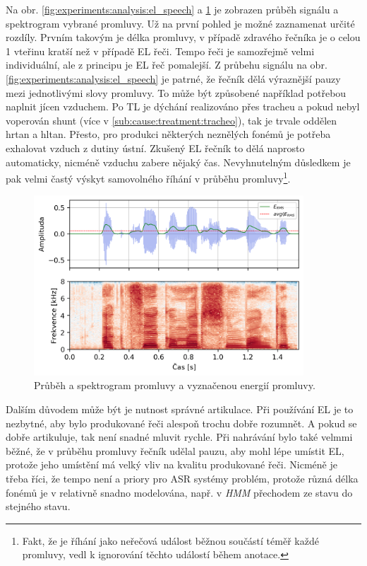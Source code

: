 Na obr. \ref{fig:experiments:analysis:el_speech} a \ref{fig:experiments:analysis:normal_speech} je zobrazen průběh signálu a spektrogram vybrané promluvy. Už na první pohled je možné zaznamenat určité rozdíly. Prvním takovým je délka promluvy, v případě zdravého řečníka je o celou 1 vteřinu kratší než v případě EL řeči. Tempo řeči je samozřejmě velmi individuální, ale z principu je EL řeč pomalejší. Z průbehu signálu na obr. \ref{fig:experiments:analysis:el_speech} je patrné, že řečník dělá výraznější pauzy mezi jednotlivými slovy promluvy. To může být způsobené například potřebou naplnit jícen vzduchem. Po TL je dýchání realizováno přes tracheu a pokud nebyl voperován shunt (více v \ref{sub:cause:treatment:tracheo}), tak je trvale oddělen hrtan a hltan. Přesto, pro produkci některých neznělých fonémů je potřeba exhalovat vzduch z dutiny ústní. Zkušený EL řečník to dělá naprosto automaticky, nicméně  vzduchu zabere nějaký čas. Nevyhnutelným důsledkem je pak velmi častý výskyt samovolného říhání v průběhu promluvy\footnote{Fakt, že je říhání jako neřečová událost běžnou součástí téměř každé promluvy, vedl k ignorování těchto událostí během anotace.}.

\begin{figure}[hbpt]
  \centering
  \includegraphics[width=0.9\textwidth]{./ch4-experiments/img/energy_spec_normal.png}
  \caption{Průběh a spektrogram promluvy a vyznačenou energií promluvy.}
  \label{fig:experiments:analysis:normal_speech}
\end{figure}

Dalším důvodem může být je nutnost správné artikulace. Při používání EL je to nezbytné, aby bylo produkované řeči alespoň trochu dobře rozumnět. A pokud se dobře artikuluje, tak není snadné mluvit rychle. Při nahrávání bylo také velmmi běžné, že v průběhu promluvy řečník udělal pauzu, aby mohl lépe umístit EL, protože jeho umístění má velký vliv na kvalitu produkované řeči. Nicméně je třeba říci, že tempo není a priory pro ASR systémy problém, protože různá délka fonémů je v relativně snadno modelována, např. v \textit{HMM} přechodem ze stavu do stejného stavu.

